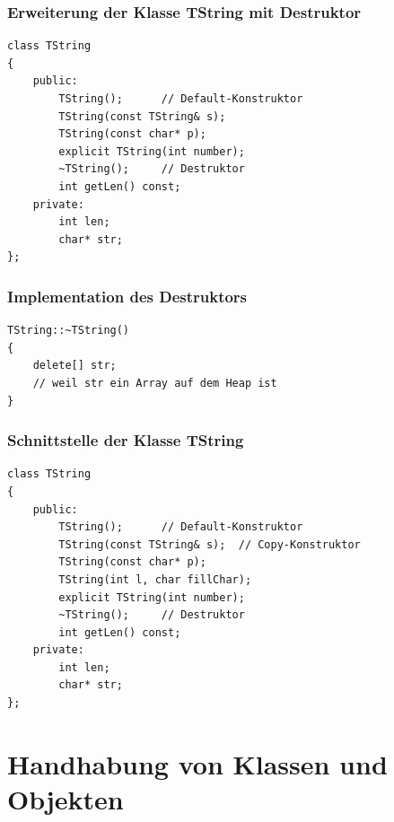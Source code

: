 \begin{multicols}{2}
\subsubsection{Erweiterung der Klasse TString mit Destruktor}
\vspace{-\baselineskip}
\begin{minipage}{\linewidth}
\begin{lstlisting}
class TString
{
	public:
		TString();		// Default-Konstruktor
		TString(const TString& s);
		TString(const char* p);
		explicit TString(int number);
		~TString();		// Destruktor
		int getLen() const;
	private:
		int len;
		char* str;
};
\end{lstlisting}
\end{minipage}
\vfill\null
\columnbreak
\subsubsection{Implementation des Destruktors}
\begin{minipage}{\linewidth}
\begin{lstlisting}
TString::~TString()
{
	delete[] str;
	// weil str ein Array auf dem Heap ist
}
\end{lstlisting}
\end{minipage}
\end{multicols}

\subsubsection{Schnittstelle der Klasse TString}
\vspace{-\baselineskip}
\begin{minipage}{0.7\linewidth}
\begin{lstlisting}
class TString
{
	public:
		TString();		// Default-Konstruktor
		TString(const TString& s);	// Copy-Konstruktor
		TString(const char* p);
		TString(int l, char fillChar);
		explicit TString(int number);
		~TString();		// Destruktor
		int getLen() const;
	private:
		int len;
		char* str;
};
\end{lstlisting}
\end{minipage}

\section{Handhabung von Klassen und Objekten}

